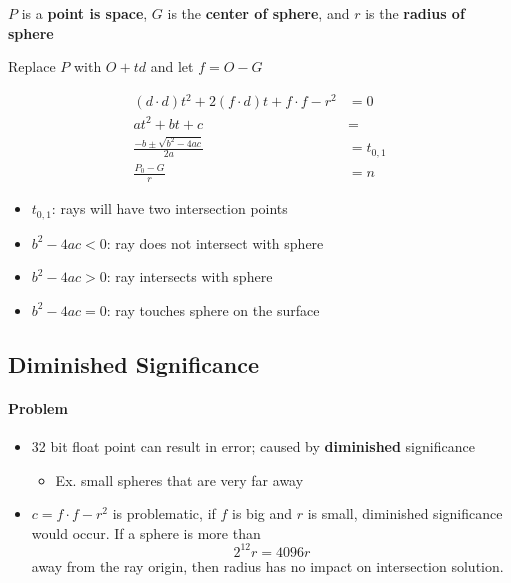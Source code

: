  $ P $ is a \textbf{point is space}, $ G $ is the \textbf{center of sphere},
  and $ r $ is the \textbf{radius of sphere}

  Replace $ P $ with $ O + td $ and let $ f = O - G  $

  \begin{align}
    \left( d \cdot d \right) t^{2}
      + 2 \left( f \cdot d \right) t
      + f \cdot f - r^{2}
    &= 0 \\
    a t^{2} + bt + c &= \\
    \frac{-b \pm \sqrt{b^{2} - 4ac}}{2a} &= t_{0, 1} \\
    \frac{P_{0} - G}{r} &= n
  \end{align}

  \begin{itemize}
    \item $ t_{0, 1} $: rays will have two intersection points
    \item $ b^{2} - 4ac < 0 $: ray does not intersect with sphere
    \item $ b^{2} - 4ac > 0 $: ray intersects with sphere
    \item $ b^{2} - 4ac = 0 $: ray touches sphere on the surface
  \end{itemize}

  \subsection{Diminished Significance}

    \paragraph{Problem}
    \begin{itemize}
      \item 32 bit float point can result in error; caused by
      \textbf{diminished} significance
      \begin{itemize}
        \item Ex. small spheres that are very far away
      \end{itemize}

      \item $ c = f \cdot f - r^{2}  $ is problematic, if $ f $ is big and $ r $ is
      small, diminished significance would occur. If a sphere is more than
      \begin{equation}
        2^{12} r = 4096 r
      \end{equation}
      away from the ray origin, then radius has no impact on intersection
      solution.
    \end{itemize}


